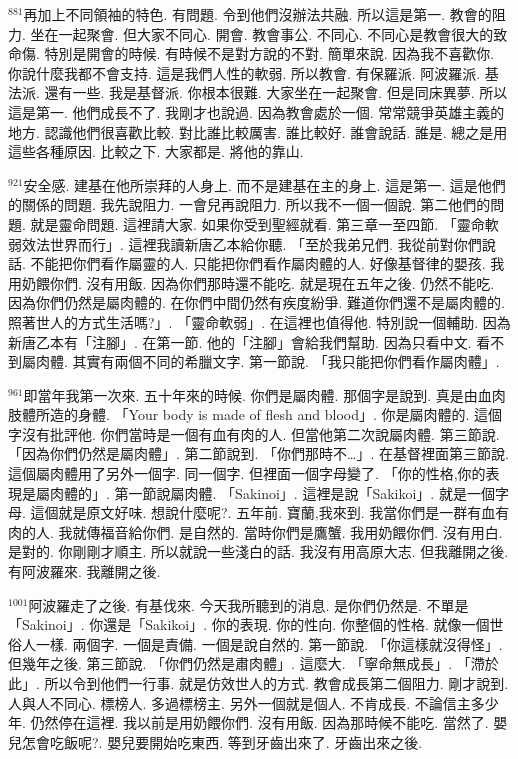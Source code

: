 \documentclass{book}
\begin{document}
$^{881}$再加上不同領袖的特色.
有問題.
令到他們沒辦法共融.
所以這是第一.
教會的阻力.
坐在一起聚會.
但大家不同心.
開會.
教會事公.
不同心.
不同心是教會很大的致命傷.
特別是開會的時候.
有時候不是對方說的不對.
簡單來說.
因為我不喜歡你.
你說什麼我都不會支持.
這是我們人性的軟弱.
所以教會.
有保羅派.
阿波羅派.
基法派.
還有一些.
我是基督派.
你根本很難.
大家坐在一起聚會.
但是同床異夢.
所以這是第一.
他們成長不了.
我剛才也說過.
因為教會處於一個.
常常競爭英雄主義的地方.
認識他們很喜歡比較.
對比誰比較厲害.
誰比較好.
誰會說話.
誰是.
總之是用這些各種原因.
比較之下.
大家都是.
將他的靠山.

$^{921}$安全感.
建基在他所崇拜的人身上.
而不是建基在主的身上.
這是第一.
這是他們的關係的問題.
我先說阻力.
一會兒再說阻力.
所以我不一個一個說.
第二他們的問題.
就是靈命問題.
這裡請大家.
如果你受到聖經就看.
第三章一至四節.
「靈命軟弱效法世界而行」.
這裡我讀新唐乙本給你聽.
「至於我弟兄們.
我從前對你們說話.
不能把你們看作屬靈的人.
只能把你們看作屬肉體的人.
好像基督律的嬰孩.
我用奶餵你們.
沒有用飯.
因為你們那時還不能吃.
就是現在五年之後.
仍然不能吃.
因為你們仍然是屬肉體的.
在你們中間仍然有疾度紛爭.
難道你們還不是屬肉體的.
照著世人的方式生活嗎?」.
「靈命軟弱」.
在這裡也值得他.
特別說一個輔助.
因為新唐乙本有「注腳」.
在第一節.
他的「注腳」會給我們幫助.
因為只看中文.
看不到屬肉體.
其實有兩個不同的希臘文字.
第一節說.
「我只能把你們看作屬肉體」.

$^{961}$即當年我第一次來.
五十年來的時候.
你們是屬肉體.
那個字是說到.
真是由血肉肢體所造的身體.
「Your body is made of flesh and blood」.
你是屬肉體的.
這個字沒有批評他.
你們當時是一個有血有肉的人.
但當他第二次說屬肉體.
第三節說.
「因為你們仍然是屬肉體」.
第二節說到.
「你們那時不…」.
在基督裡面第三節說.
這個屬肉體用了另外一個字.
同一個字.
但裡面一個字母變了.
「你的性格,你的表現是屬肉體的」.
第一節說屬肉體.
「Sakinoi」.
這裡是說「Sakikoi」.
就是一個字母.
這個就是原文好味.
想說什麼呢?.
五年前.
寶蘭,我來到.
我當你們是一群有血有肉的人.
我就傳福音給你們.
是自然的.
當時你們是鷹蟹.
我用奶餵你們.
沒有用白.
是對的.
你剛剛才順主.
所以就說一些淺白的話.
我沒有用高原大志.
但我離開之後.
有阿波羅來.
我離開之後.

$^{1001}$阿波羅走了之後.
有基伐來.
今天我所聽到的消息.
是你們仍然是.
不單是「Sakinoi」.
你還是「Sakikoi」.
你的表現.
你的性向.
你整個的性格.
就像一個世俗人一樣.
兩個字.
一個是責備.
一個是說自然的.
第一節說.
「你這樣就沒得怪」.
但幾年之後.
第三節說.
「你們仍然是肅肉體」.
這麼大.
「寧命無成長」.
「滯於此」.
所以令到他們一行事.
就是仿效世人的方式.
教會成長第二個阻力.
剛才說到.
人與人不同心.
標榜人.
多過標榜主.
另外一個就是個人.
不肯成長.
不論信主多少年.
仍然停在這裡.
我以前是用奶餵你們.
沒有用飯.
因為那時候不能吃.
當然了.
嬰兒怎會吃飯呢?.
嬰兒要開始吃東西.
等到牙齒出來了.
牙齒出來之後.
\end{document}
